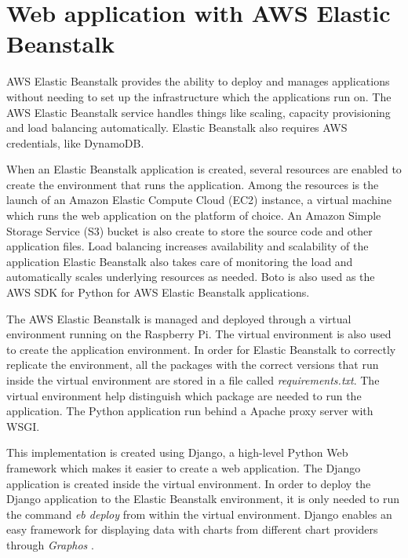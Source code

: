 

\section{Web application with AWS Elastic Beanstalk}
AWS Elastic Beanstalk provides the ability to deploy and manages applications without needing to set up the infrastructure which the applications run on. The AWS Elastic Beanstalk service handles things like scaling, capacity provisioning and load balancing automatically. Elastic Beanstalk also requires AWS credentials, like DynamoDB. 

When an Elastic Beanstalk application is created, several resources are enabled to create the environment that runs the application. Among the resources is the launch of an Amazon Elastic Compute Cloud (EC2) instance, a virtual machine which runs the web application on the platform of choice. An Amazon Simple Storage Service (S3) bucket is also create to store the source code and other application files. Load balancing increases availability and scalability of the application Elastic Beanstalk also takes care of monitoring the load and automatically scales underlying resources as needed. Boto is also used as the AWS SDK for Python for AWS Elastic Beanstalk applications.

The AWS Elastic Beanstalk is managed and deployed through a virtual environment running on the Raspberry Pi. The virtual environment is also used to create the application environment. In order for Elastic Beanstalk to correctly replicate the environment, all the packages with the correct versions that run inside the virtual environment are stored in a file called \textit{requirements.txt}. The virtual environment help distinguish which package are needed to run the application. The Python application run behind a Apache proxy server with WSGI. %


This implementation is created using Django, a high-level Python Web framework which makes it easier to create a web application\cite{django}. The Django application is created inside the virtual environment. In order to deploy the Django application to the Elastic Beanstalk environment, it is only needed to run the command \textit{eb deploy} from within the virtual environment. Django enables an easy framework for displaying data with charts from different chart providers through \textit{Graphos} \cite{graphos}.

